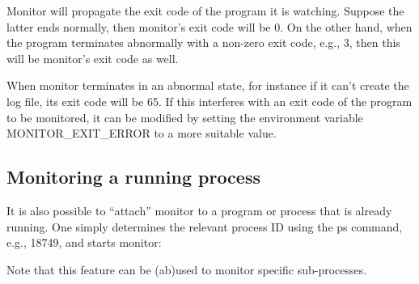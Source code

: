   Monitor will propagate the exit code of the program it is watching. Suppose the
  latter ends normally, then monitor's exit code will be 0. On the other hand,
  when the program terminates abnormally with a non-zero exit code, e.g., 3, then
  this will be monitor's exit code as well.
  
  When monitor terminates in an abnormal state, for instance if it can't
  create the log file, its exit code will be 65. If this interferes with an exit
  code of the program to be monitored, it can be modified by setting the
  environment variable MONITOR\_EXIT\_ERROR to a more suitable value.
  
  \subsection{Monitoring a running process}
  
  It is also possible to ``attach'' monitor to a program or process that is already
  running. One simply determines the relevant process ID using the ps command,
  e.g., 18749, and starts monitor:
  
  \begin{prompt}
  \end{prompt}
  
  Note that this feature can be (ab)used to monitor specific sub-processes.
\fi
